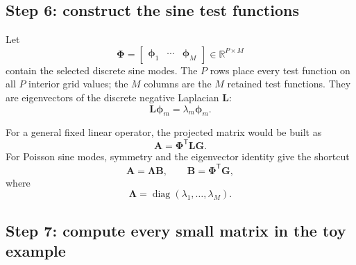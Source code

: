 \documentclass[11pt]{article}
\newcommand{\mat}[1]{\mathbf{#1}}
\newcommand{\vect}[1]{\mathbf{#1}}
\newcommand{\R}{\mathbb{R}}
\begin{document}
\subsection{Step 6: construct the sine test functions}

Let
\begin{equation}
  \mat{\Phi}
  =\begin{bmatrix}\vect{\phi}_1&\cdots&\vect{\phi}_M\end{bmatrix}
  \in\R^{P\times M}
\end{equation}
contain the selected discrete sine modes.  The $P$ rows place every test
function on all $P$ interior grid values; the $M$ columns are the $M$ retained
test functions.  They are eigenvectors of the
discrete negative Laplacian $\mat{L}$:
\begin{equation}
  \mat{L}\vect{\phi}_m=\lambda_m\vect{\phi}_m.
\end{equation}

For a general fixed linear operator, the projected matrix would be built as
\begin{equation}
  \mat{A}=\mat{\Phi}^{\mathsf T}\mat{L}\mat{G}.
\end{equation}
For Poisson sine modes, symmetry and the eigenvector identity give the
shortcut
\begin{equation}
  \mat{A}=\mat{\Lambda}\mat{B},
  \qquad
  \mat{B}=\mat{\Phi}^{\mathsf T}\mat{G},
\end{equation}
where
\begin{equation}
  \mat{\Lambda}=\operatorname{diag}(\lambda_1,\ldots,\lambda_M).
\end{equation}

\subsection{Step 7: compute every small matrix in the toy example}
\end{document}
